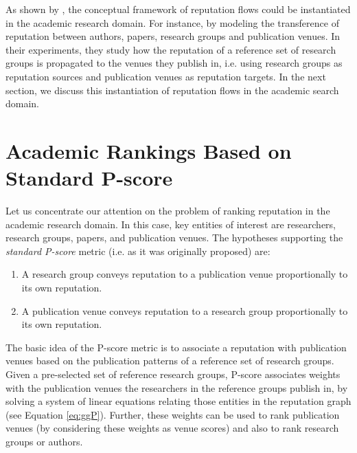 \documentclass[msc]{ppgccufmg}
\begin{document}
As shown by \citeauthor{ribas2015random}, the conceptual framework of reputation flows could be instantiated in the academic research domain. For instance, by modeling the transference of reputation between authors, papers, research groups and publication venues. In their experiments, they study how the reputation of a reference set of research groups is propagated to the venues they publish in, i.e. using research groups as reputation sources and publication venues as reputation targets. In the next section, we discuss this instantiation of reputation flows in the academic search domain.

\section{Academic Rankings Based on Standard P-score}\label{sec:spscore}

Let us concentrate our attention on the problem of ranking reputation in the academic research domain. In this case, key entities of interest are researchers, research groups, papers, and publication venues. The hypotheses supporting the \textit{standard P-score} metric (i.e. as it was originally proposed) are:

\begin{enumerate}
	\item A research group conveys reputation to a publication venue proportionally to its own reputation.
	\item A publication venue conveys reputation to a research group proportionally to its own reputation.
\end{enumerate}

The basic idea of the P-score metric is to associate a reputation with publication venues based on the publication patterns of a reference set of research groups. Given a pre-selected set of reference research groups, P-score associates weights with the publication venues the researchers in the reference groups publish in, by solving a system of linear equations relating those entities in the reputation graph (see Equation \ref{eq:ggP}). Further, these weights can be used to rank publication venues (by considering these weights as venue scores) and also to rank research groups or authors.
\end{document}
